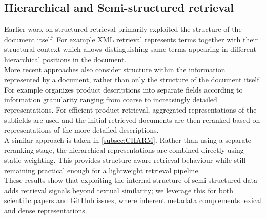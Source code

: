 \documentclass[11pt]{article}
\begin{document}
\subsection{Hierarchical and Semi-structured retrieval}
Earlier work on structured retrieval primarily exploited the structure of the document itself. For example XML retrieval \cite{schutze2008introduction} represents terms together with their structural context which allows distinguishing same terms appearing in different hierarchical positions in the document.\\
More recent approaches also consider structure within the information represented by a document, rather than only the structure of the document itself. For example \citet{freymuth_hierarchical_2025} organizes product descriptions into separate fields according to information granularity ranging from coarse to increasingly detailed representations. For efficient product retrieval, aggregated representations of the subfields are used and the initial retrieved documents are then reranked based on representations of the more detailed descriptions.\\
A similar approach is taken in \ref{subsec:CHARM}. Rather than using a separate reranking stage, the hierarchical representations are combined directly using static weighting. This provides structure-aware retrieval behaviour while still remaining practical enough for a lightweight retrieval pipeline.\\
These results show that exploiting the internal structure of semi-structured data adds retrieval signals beyond textual similarity; we leverage this for both scientific papers and GitHub issues, where inherent metadata complements lexical and dense representations.
\end{document}
